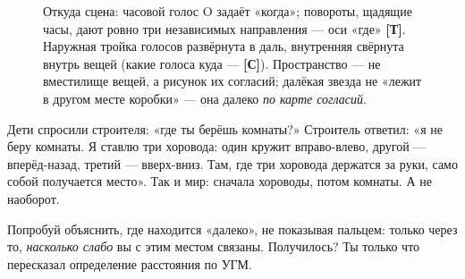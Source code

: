 \documentclass[11pt,letterpaper]{article}
\newcommand{\stT}{\textbf{[Т]}\xspace}
\newcommand{\stC}{\textbf{[С]}\xspace}
\begin{document}
\begin{figure}[H]
\centering
{}
\caption{Откуда сцена: часовой голос O задаёт «когда»; повороты,
щадящие часы, дают ровно три независимых направления --- оси «где»
\stT. Наружная тройка голосов развёрнута в даль, внутренняя свёрнута
внутрь вещей (какие голоса куда --- \stC). Пространство --- не вместилище
вещей, а рисунок их согласий; далёкая звезда не «лежит в другом месте
коробки» --- она далеко \emph{по карте согласий}.}
\label{fig:stage}
\end{figure}

\begin{skazbox}
Дети спросили строителя: «где ты берёшь комнаты?» Строитель ответил:
«я не беру комнаты. Я ставлю три хоровода: один кружит вправо-влево,
другой --- вперёд-назад, третий --- вверх-вниз. Там, где три хоровода
держатся за руки, само собой получается место». Так и мир: сначала
хороводы, потом комнаты. А не наоборот.
\end{skazbox}

\begin{askbox}
Попробуй объяснить, где находится «далеко», не показывая пальцем:
только через то, \emph{насколько слабо} вы с этим местом связаны.
Получилось? Ты только что пересказал определение расстояния по УГМ.
\end{askbox}

\end{document}
